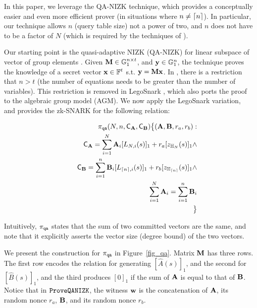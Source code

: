 In this paper,
we leverage the QA-NIZK technique, which provides a conceptually
easier and even more efficient prover (in situations where
$n \neq {\lceil{n}\rceil}$).
In particular,
our technique allows $n$ (query table size) not a power of two,
and $n$ does not have to be a factor of $N$ (which is
required by the techniques of \cite{MatrixLookup}).

Our starting point is the quasi-adaptive NIZK (QA-NIZK)
for linear subspace of vector of group elements \cite{KW15}.
Given ${{\mathbf {M}}} \in {\mathbb{G}}_1^{n\times t}$, and
${{\mathbf {y}}} \in {\mathbb{G}}_1^{n}$, the technique
proves the knowledge of a secret vector ${{\mathbf {x}}} \in \mathbb{F}^t$
s.t. ${{\mathbf {y}}} = {{\mathbf {M}}} {{\mathbf {x}}}$. In \cite{KW15},
there is a restriction that $n>t$ (the number of equations
needs to be greater than the number of variables). This restriction is
removed in LegoSnark \cite[Appendix D]{LegoSnarkFull}, 
which also ports the proof to the algebraic group model (AGM). We now apply
the LegoSnark variation, and provides the zk-SNARK
for the following relation:

\begin{small}
\begin{eqnarray*}
 & & \pi_{\texttt{qa}}(N,n,{\mathsf{C}}_{{{\mathbf {A}}}}, {\mathsf{C}}_{{{\mathbf {B}}}}) 
 \big\{
 ({{\mathbf {A}}}, {{\mathbf {B}}}, r_a, r_b):  \\
 & & 
  \hspace*{0.2in}
  {\mathsf{C}}_{{{\mathbf {A}}}} = \sum_{i=1}^N {{\mathbf {A}}}_i [L_{N,i}(s)]_1 +
 	r_a [z_{\mathbb{H}_{N}}(s)]_1  \wedge  \\
 & & 
  \hspace*{0.2in}
   {\mathsf{C}}_{{{\mathbf {B}}}} = \sum_{i=1}^n {{\mathbf {B}}}_i [L_{{\lceil{n}\rceil},i}(s)]_1 +
 	r_b [z_{\mathbb{H}_{{\lceil{n}\rceil}}}(s)]_1 \wedge  \\
 & & 
  \hspace*{0.2in}
   \sum_{i=1}^N {{\mathbf {A}}}_i = \sum_{i=1}^n {{\mathbf {B}}}_i  \\
 & & 
 \big\}
\end{eqnarray*}
\end{small}

Intuitively, $\pi_{\texttt{qa}}$ states that the sum of
two committed vectors are the same, and note that
it explicitly asserts the vector size (degree bound)
of the two vectors. 

We present the construction for $\pi_{\texttt{qa}}$ 
in Figure\ \ref{fig_qa}. 
Matrix ${{\mathbf {M}}}$ has three rows.
The first row encodes the relation for generating
$[\hat{A}(s)]_1$, and the second for $[\hat{B}(s)]_1$,
and the third produces  $[0]_1$ if the
sum of ${{\mathbf {A}}}$ is equal to that of
${{\mathbf {B}}}$. Notice that in 
$\texttt{ProveQANIZK}$, the
witness ${{\mathbf {w}}}$ is the concatenation of 
${{\mathbf {A}}}$, its random nonce $r_a$,
${{\mathbf {B}}}$, and its random nonce $r_b$. 

